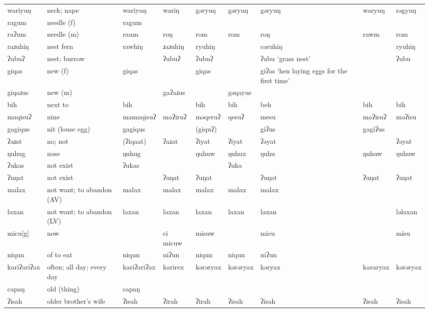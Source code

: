 \begin{landscape}
\begin{longtable}{*{9}{>{\raggedright\arraybackslash}p{}}}
\text{*}wariyuŋ      & neck; nape & wariyuŋ & wariŋ & gəryuŋ & gəryuŋ & gəryuŋ & waryuŋ & rəgyuŋ\\
\text{*}ragum        & needle (f) & ragum &  &  &  &  &  & \\
\text{*}raʔum        & needle (m) & raum & roŋ & rom & rom & roŋ & rawm & rom\\
\text{*}raɹuhiŋ      & nest fern & rawhiŋ & ɹaɹuhiŋ & ryuhiŋ &  & cəruhiŋ &  & ryuhiŋ\\
\text{*}ʔubuʔ        & nest; burrow &  & ʔubuʔ & ʔubuʔ &  & ʔubu \newline `grass nest' &  & ʔubu\\
\text{*}giqas        & new (f) & giqas &  & giqas &  & giʔas `hen laying eggs for the first time' &  & \\
\text{*}giqaɹus      & new (m) &  & gaʔaɹus &  & gəqayus &  &  & \\
\text{*}bih          & next to & bih &  & bih & bih & beh & bih & bih\\
\text{*}maqisuʔ      & nine & mamaqisuʔ & maʔiruʔ & məqeruʔ & qesuʔ & mesu & maʔisuʔ & məʔisu\\
\text{*}gagiqus      & nit (louse egg) & gagiqus &  & (giquʔ) &  & giʔus & gagiʔus & \\
\text{*}ʔəɹat        & no; not & (ʔiqaat) & ʔaɹat & ʔiyat & ʔiyat & ʔəyat &  & ʔəyat\\
\text{*}ŋuhug        & nose & ŋuhug &  & ŋuhuw & ŋuhux & ŋuhu & ŋuhuw & ŋuhuw\\
\text{*}ʔukas        & not exist & ʔukas &  &  & ʔuka &  &  & \\
\text{*}ʔuŋat        & not exist &  & ʔuŋat & ʔuŋat &  & ʔuŋat & ʔuŋat & ʔuŋat\\
\text{*}malax        & not want; to abandon (AV) & malax & malax & malax & malax & malax &  & \\
\text{*}laxan        & not want; to abandon (LV) & laxan & laxan & laxan & laxan & laxan &  & ləlaxan\\
\text{*}micu[g]      & now &  & ci micuw & misuw &  & micu &  & misu\\
\text{*}niqun        & of to eat & niqun & niʔun & niqun & niqun & niʔun &  & \\
\text{*}kariʔariʔax  & often; all day; every day & kariʔariʔax & karirex & kərəryax & kərəryax & kəryax & kararyax & kərəryax\\
\text{*}capaŋ        & old (thing) & capaŋ &  &  &  &  &  & \\
\text{*}ʔisah        & older brother's wife & ʔisah & ʔirah & ʔirah & ʔisah & ʔisah & ʔisah & ʔisah\\

\end{longtable}
\end{landscape}
